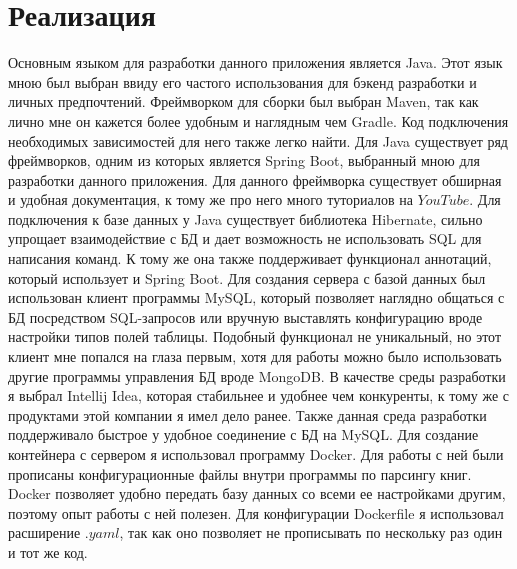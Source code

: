 \section*{Реализация}
Основным языком для разработки данного приложения является Java. Этот язык мною был выбран ввиду его частого использования для бэкенд разработки и личных предпочтений. Фреймворком для сборки был выбран Maven, так как лично мне он кажется более удобным и наглядным чем Gradle. Код подключения необходимых зависимостей для него также легко найти. Для Java существует ряд фреймворков, одним из которых является Spring Boot, выбранный мною для разработки данного приложения. Для данного фреймворка существует обширная и удобная документация, к тому же про него много туториалов на $YouTube$. Для подключения к базе данных у Java существует библиотека Hibernate, сильно упрощает взаимодействие с БД и дает возможность не использовать SQL для написания команд. К тому же она также поддерживает функционал аннотаций, который использует и Spring Boot. Для создания сервера с базой данных был использован клиент программы MySQL, который позволяет наглядно общаться с БД посредством SQL-запросов или вручную выставлять конфигурацию вроде настройки типов полей таблицы. Подобный функционал не уникальный, но этот клиент мне попался на глаза первым, хотя для работы можно было использовать другие программы управления БД вроде MongoDB. В качестве среды разработки я выбрал Intellij Idea, которая стабильнее и удобнее чем конкуренты, к тому же с продуктами этой компании я имел дело ранее. Также данная среда разработки поддерживало быстрое у удобное соединение с БД на MySQL. Для создание контейнера с сервером я использовал программу Docker. Для работы с ней были прописаны конфигурационные файлы внутри программы по парсингу книг. Docker позволяет удобно передать базу данных со всеми ее настройками другим, поэтому опыт работы с ней полезен. Для конфигурации Dockerfile я использовал расширение $.yaml$, так как оно позволяет не прописывать по нескольку раз один и тот же код.   
